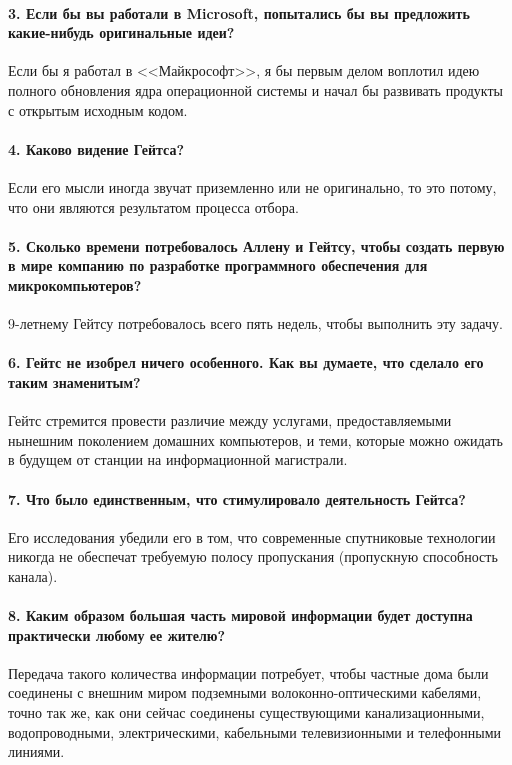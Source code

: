     \paragraph{3. Если бы вы работали в Microsoft, попытались бы вы предложить какие-нибудь оригинальные идеи?}
    Если бы я работал в <<Майкрософт>>, я бы первым делом воплотил идею полного обновления ядра операционной системы и начал бы развивать продукты с открытым исходным кодом.
    
    \paragraph{4. Каково видение Гейтса?}
    Если его мысли иногда звучат приземленно или не оригинально, то это потому, что они являются результатом процесса отбора.
    
    \paragraph{5. Сколько времени потребовалось Аллену и Гейтсу, чтобы создать первую в мире компанию по разработке программного обеспечения для микрокомпьютеров?}
    9-летнему Гейтсу потребовалось всего пять недель, чтобы выполнить эту задачу.
    
    \paragraph{6. Гейтс не изобрел ничего особенного. Как вы думаете, что сделало его таким знаменитым?}
    Гейтс стремится провести различие между услугами, предоставляемыми нынешним поколением домашних компьютеров, и теми, которые можно ожидать в будущем от станции на информационной магистрали.
    
    \paragraph{7. Что было единственным, что стимулировало деятельность Гейтса?}
    Его исследования убедили его в том, что современные спутниковые технологии никогда не обеспечат требуемую полосу пропускания (пропускную способность канала).
    
    \paragraph{8. Каким образом большая часть мировой информации будет доступна практически любому ее жителю?}
    Передача такого количества информации потребует, чтобы частные дома были соединены с внешним миром подземными волоконно-оптическими кабелями, точно так же, как они сейчас соединены существующими канализационными, водопроводными, электрическими, кабельными телевизионными и телефонными линиями.
    

